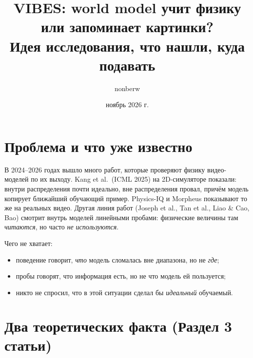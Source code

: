 \documentclass[11pt]{article}
\title{\textbf{VIBES: world model учит физику или запоминает картинки?}\\[0.3em]
\large Идея исследования, что нашли, куда подавать}
\author{nonberw}
\date{ноябрь 2026 г.}
\begin{document}
\maketitle

\begin{center}
\end{center}

\section{Проблема и что уже известно}

В 2024--2026 годах вышло много работ, которые проверяют физику видео-моделей по их выходу.
Kang et al.\ (ICML 2025) на 2D-симуляторе показали: внутри распределения почти идеально, вне
распределения провал, причём модель копирует ближайший обучающий пример. Physics-IQ и Morpheus
показывают то же на реальных видео. Другая линия работ (Joseph et al., Tan et al., Liao \& Cao,
Bao) смотрит внутрь моделей линейными пробами: физические величины там \emph{читаются}, но
часто \emph{не используются}.

Чего не хватает:
\begin{itemize}
\item поведение говорит, \emph{что} модель сломалась вне диапазона, но не \emph{где};
\item пробы говорят, что информация есть, но не что модель ей пользуется;
\item никто не спросил, что в этой ситуации сделал бы \emph{идеальный} обучаемый.
\end{itemize}

\section{Два теоретических факта (Раздел 3 статьи)}
\end{document}
